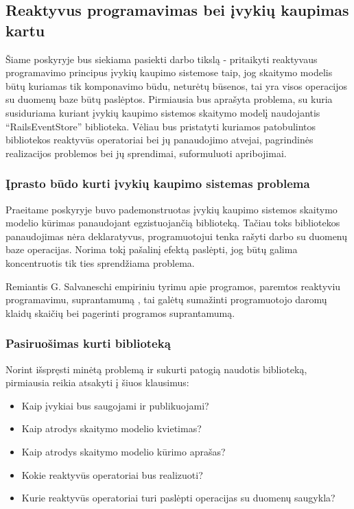\subsection{Reaktyvus programavimas bei įvykių kaupimas kartu}

Šiame poskyryje bus siekiama pasiekti darbo tikslą - pritaikyti reaktyvaus programavimo principus įvykių kaupimo sistemose taip, jog skaitymo modelis būtų kuriamas tik komponavimo būdu, neturėtų būsenos, tai yra visos operacijos su duomenų baze būtų paslėptos. Pirmiausia bus aprašyta problema, su kuria susiduriama kuriant įvykių kaupimo sistemos skaitymo modelį naudojantis ``RailsEventStore'' biblioteka. Vėliau bus pristatyti kuriamos patobulintos bibliotekos reaktyvūs operatoriai bei jų panaudojimo atvejai, pagrindinės realizacijos problemos bei jų sprendimai, suformuluoti apribojimai.

\subsubsection{Įprasto būdo kurti įvykių kaupimo sistemas problema}

Praeitame poskyryje buvo pademonstruotas įvykių kaupimo sistemos skaitymo modelio kūrimas panaudojant egzistuojančią biblioteką. Tačiau toks bibliotekos panaudojimas nėra deklaratyvus, programuotojui tenka rašyti darbo su duomenų baze operacijas. Norima tokį pašalinį efektą paslėpti, jog būtų galima koncentruotis tik ties sprendžiama problema.

Remiantis G. Salvaneschi empiriniu tyrimu apie programos, paremtos reaktyviu programavimu, suprantamumą \cite{Salvaneschi:2014:ESP:2635868.2635895}, tai galėtų sumažinti programuotojo daromų klaidų skaičių bei pagerinti programos suprantamumą.

\subsubsection{Pasiruošimas kurti biblioteką}

Norint išspręsti minėtą problemą ir sukurti patogią naudotis biblioteką, pirmiausia reikia atsakyti į šiuos klausimus:

\begin{itemize}
  \item Kaip įvykiai bus saugojami ir publikuojami?
  \item Kaip atrodys skaitymo modelio kvietimas?
  \item Kaip atrodys skaitymo modelio kūrimo aprašas?
  \item Kokie reaktyvūs operatoriai bus realizuoti?
  \item Kurie reaktyvūs operatoriai turi paslėpti operacijas su duomenų saugykla?
\end{itemize}

